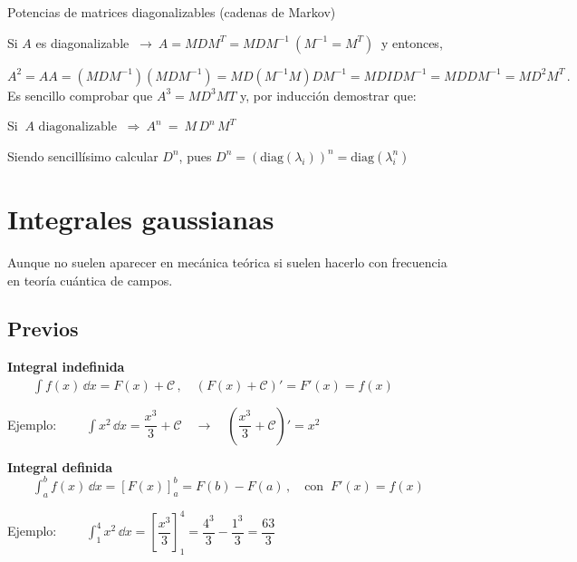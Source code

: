 \begin{myexampleblock} {Potencias de matrices diagonalizables (cadenas de Markov)}
	
\vspace{2mm}	Si $A$ es diagonalizable $\ \to \ A=MDM^T=MDM^{-1}\ (M^{-1}=M^T)\ $ y entonces,
	
\vspace{2mm}	$A^2=AA=(MDM^{-1})(MDM^{-1})=MD(M^{-1}M)DM^{-1}=MDIDM^{-1}=MDDM^{-1}=MD^2M^T\, . \ $ Es sencillo comprobar que $A^3=MD^3MT$ y, por inducción demostrar que:
	
\vspace{2mm}	Si $\ A \text{ diagonalizable } \ \Rightarrow \ A^n\ = \ M \, D^n\, M^T $
	
\vspace{2mm} Siendo sencillísimo calcular $D^n$, pues $D^n=\left( \text{diag} (\lambda_i) \right)^n=\text{diag} (\lambda_i^n) $
\vspace{2mm}	
	
\end{myexampleblock}








\chapter{Integrales gaussianas}
\label{Integrales gaussianas}

Aunque no suelen aparecer en mecánica teórica si suelen hacerlo con frecuencia en teoría cuántica de campos.

\section{Previos}

\textbf{Integral indefinida} $\qquad \displaystyle \int f(x)\, \dd x = F(x) + \mathcal C \, , \quad (F(x)+\mathcal C)'=F'(x)=f(x)$

\textcolor{gris}{Ejemplo: $\qquad \displaystyle \int x^2\, \dd x = \dfrac {x^3} 3 + \mathcal C  \quad \to \quad \left(  \dfrac {x^3} 3 + \mathcal C  \right)'=x^2$ }

\textbf{Integral definida} $\qquad \displaystyle \int_a^b f(x)\, \dd x = \left[ F(x) \right]_a^b=F(b)-F(a) \, , \quad \text{con } \ F'(x)=f(x)$

\textcolor{gris}{Ejemplo: $\qquad \displaystyle \int_1^4 x^2\, \dd x = \left[ \dfrac {x^3} 3 \right]_1^4= \dfrac {4^3}3 - \dfrac {1^3}3=\dfrac {63} 3$ }


